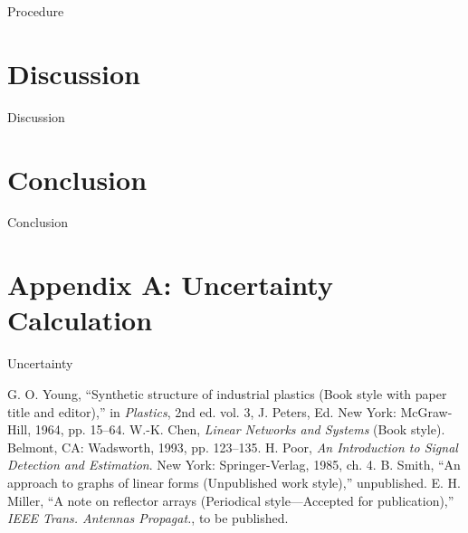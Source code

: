 \documentclass[journal,letterpaper]{IEEEtran}
\begin{document}
Procedure


\section{Discussion}


Discussion


\section{Conclusion}


Conclusion


\section*{Appendix A: Uncertainty Calculation}


Uncertainty


\begin{thebibliography}{9}
     G. O. Young, ``Synthetic structure of industrial plastics (Book style with paper title and editor),'' in \textit{Plastics}, 2nd ed. vol. 3, J. Peters, Ed. New York: McGraw-Hill, 1964, pp. 15--64.
     W.-K. Chen, \textit{Linear Networks and Systems} (Book style).	Belmont, CA: Wadsworth, 1993, pp. 123--135.
     H. Poor, \textit{An Introduction to Signal Detection and Estimation}. New York: Springer-Verlag, 1985, ch. 4.
     B. Smith, ``An approach to graphs of linear forms (Unpublished work style),'' unpublished.
     E. H. Miller, ``A note on reflector arrays (Periodical style—Accepted for publication),'' \textit{IEEE Trans. Antennas Propagat.}, to be published.
\end{thebibliography}
\end{document}
